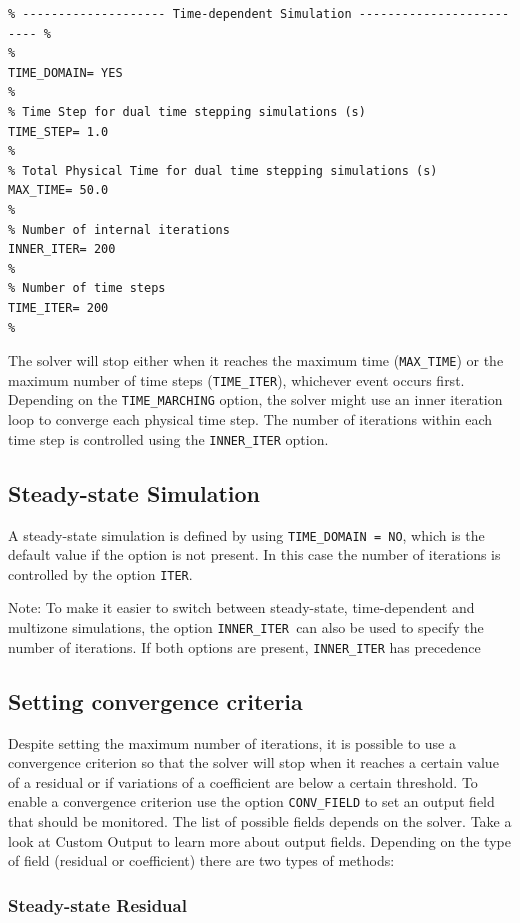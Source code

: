 \documentclass{article}
\begin{document}
\begin{lstlisting}
% -------------------- Time-dependent Simulation ------------------------- %
%
TIME_DOMAIN= YES
%
% Time Step for dual time stepping simulations (s)
TIME_STEP= 1.0
%
% Total Physical Time for dual time stepping simulations (s)
MAX_TIME= 50.0
%
% Number of internal iterations 
INNER_ITER= 200
%
% Number of time steps
TIME_ITER= 200
%
\end{lstlisting}


The solver will stop either when it reaches the maximum time (\verb|MAX_TIME|) or the maximum number of time steps (\verb|TIME_ITER|), whichever event occurs first. Depending on the \verb|TIME_MARCHING| option, the solver might use an inner iteration loop to converge each physical time step. The number of iterations within each time step is controlled using the \verb|INNER_ITER| option.


\subsection{Steady-state Simulation}
A steady-state simulation is defined by using \verb|TIME_DOMAIN = NO|, which is the default value if the option is not present. In this case the number of iterations is controlled by the option \verb|ITER|.

Note: To make it easier to switch between steady-state, time-dependent and multizone simulations, the option \verb|INNER_ITER |can also be used to specify the number of iterations. If both options are present, \verb|INNER_ITER| has precedence

\subsection{Setting convergence criteria}
Despite setting the maximum number of iterations, it is possible to use a convergence criterion so that the solver will stop when it reaches a certain value of a residual or if variations of a coefficient are below a certain threshold. To enable a convergence criterion use the option \verb|CONV_FIELD| to set an output field that should be monitored. The list of possible fields depends on the solver. Take a look at Custom Output to learn more about output fields. Depending on the type of field (residual or coefficient) there are two types of methods:

\subsubsection{Steady-state Residual}
\end{document}
